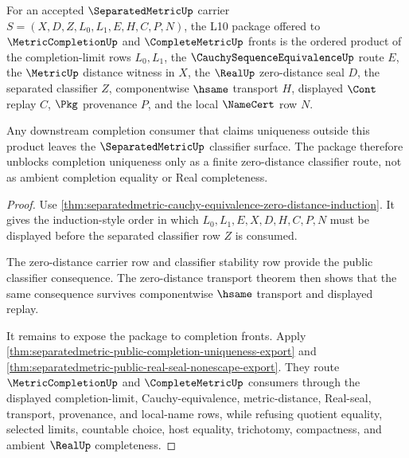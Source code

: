 \begin{theorem}
\label{thm:separatedmetric-l10-completion-unblock-package}
For an accepted $\SeparatedMetricUp$ carrier $S=(X,D,Z,L_0,L_1,E,H,C,P,N)$, the L10 package offered to $\MetricCompletionUp$ and $\CompleteMetricUp$ fronts is the ordered product of the completion-limit rows $L_0,L_1$, the $\CauchySequenceEquivalenceUp$ route $E$, the $\MetricUp$ distance witness in $X$, the $\RealUp$ zero-distance seal $D$, the separated classifier $Z$, componentwise $\hsame$ transport $H$, displayed $\Cont$ replay $C$, $\Pkg$ provenance $P$, and the local $\NameCert$ row $N$.

Any downstream completion consumer that claims uniqueness outside this product leaves the $\SeparatedMetricUp$ classifier surface. The package therefore unblocks completion uniqueness only as a finite zero-distance classifier route, not as ambient completion equality or Real completeness.
\end{theorem}
\begin{proof}
Use \autoref{thm:separatedmetric-cauchy-equivalence-zero-distance-induction}. It gives the induction-style order in which $L_0,L_1,E,X,D,H,C,P,N$ must be displayed before the separated classifier row $Z$ is consumed.

The zero-distance carrier row and classifier stability row provide the public classifier consequence. The zero-distance transport theorem then shows that the same consequence survives componentwise $\hsame$ transport and displayed replay.

It remains to expose the package to completion fronts. Apply \autoref{thm:separatedmetric-public-completion-uniqueness-export} and \autoref{thm:separatedmetric-public-real-seal-nonescape-export}. They route $\MetricCompletionUp$ and $\CompleteMetricUp$ consumers through the displayed completion-limit, Cauchy-equivalence, metric-distance, Real-seal, transport, provenance, and local-name rows, while refusing quotient equality, selected limits, countable choice, host equality, trichotomy, compactness, and ambient $\RealUp$ completeness.
\end{proof}

